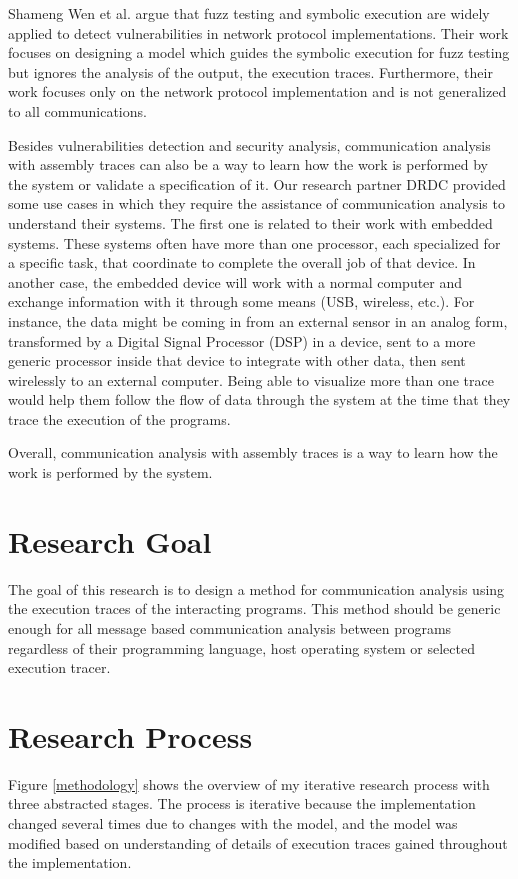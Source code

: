 Shameng Wen et al. argue that fuzz testing and symbolic execution are widely applied to detect vulnerabilities in network protocol implementations. Their work focuses on designing a model which guides the symbolic execution for fuzz testing \cite{wen2017model} but ignores the analysis of the output, the execution traces. Furthermore, their work focuses only on the network protocol implementation and is not generalized to all communications.

Besides vulnerabilities detection and security analysis, communication analysis with assembly traces can also be a way to learn how the work is performed by the system or validate a specification of it. Our research partner DRDC provided some use cases in which they require the assistance of communication analysis to understand their systems. The first one is related to their work with embedded systems. These systems often have more than one processor, each specialized for a specific task, that coordinate to complete the overall job of that device.  In another case, the embedded device will work with a normal computer and exchange information with it through some means
(USB, wireless, etc.).  For instance, the data might be coming in from an external sensor in an analog form, transformed by a Digital Signal Processor (DSP) in a device, sent to a more generic processor inside that device to integrate with other data, then sent wirelessly to an external computer. Being able to visualize more than one trace would help them follow the flow of data through the system at the time that they trace the execution of the programs.

Overall, communication analysis with assembly traces is a way to learn how the work is performed by the system. 

\section{Research Goal}
The goal of this research is to design a method for communication analysis using the execution traces of the interacting programs. This method should be generic enough for all message based communication analysis between programs regardless of their programming language, host operating system or selected execution tracer. 

\section{Research Process}
Figure \ref{methodology} shows the overview of my iterative research process with three abstracted stages. The process is iterative because the implementation changed several times due to changes with the model, and the model was modified based on understanding of details of execution traces gained throughout the implementation. 

